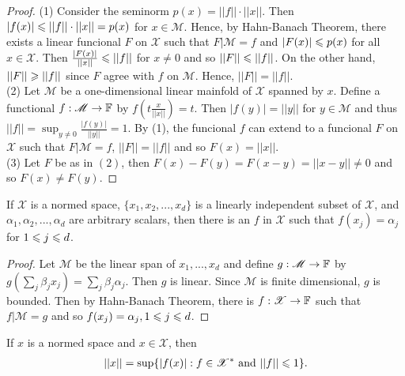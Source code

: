 \begin{proof}
    (1) Consider the seminorm $p(x)=||f||\cdot ||x||$. 
    Then $|f(x)|\leqslant ||f||\cdot ||x||=p(x)$ for $x\in\mathscr{M}$.
    Hence, by Hahn-Banach Theorem,
    there exists a linear funcional $F$ on $\mathscr{X}$ such that 
    $F|\mathscr{M}=f$ and $|F(x)|\leqslant p(x)$ for all $x\in\mathscr{X}$.
    Then $\frac{|F(x)|}{||x||}\leqslant ||f||$ for $x\neq 0$ and so $||F||\leqslant ||f||$.
    On the other hand, $||F||\geqslant ||f||$ since $F$ agree with $f$ on $\mathscr{M}$.
    Hence, $||F||=||f||$.\\
    (2) Let $\mathscr{M}$ be a one-dimensional linear mainfold of $\mathscr{X}$ spanned by $x$.
    Define a functional $f:\mathscr{M}\rightarrow \mathbb{F}$ by $f(t\frac{x}{||x||})=t$. Then $|f(y)|=||y||$ for $y\in\mathscr{M}$
    and thus $||f||=\sup_{y\neq 0} \frac{|f(y)|}{||y||}=1$. 
    By (1), the funcional $f$ can extend to a funcional $F$ on $\mathscr{X}$ such that $F|\mathscr{M}=f$, $||F||=||f||$ and so $F(x)=||x||$.
    \\
    (3) Let $F$ be as in $(2)$, then $F(x)-F(y)=F(x-y)=||x-y||\neq 0$ and so $F(x)\neq F(y)$. 
\end{proof}


\begin{corollary}{}{}
    If $\mathscr{X}$ is a normed space, $\{x_1,x_2,...,x_d\}$ is a linearly independent subset of $\mathscr{X}$, 
    and $\alpha_1,\alpha_2,...,\alpha_d$ are arbitrary scalars, then there is an $f$ in $\mathscr{X}$ such that $f(x_j)=\alpha_j$ for $1\leqslant j\leqslant d$.
\end{corollary}

\begin{proof}
    Let $\mathscr{M}$ be the linear span of $x_1,...,x_d$ and 
    define $g:\mathscr{M}\rightarrow \mathbb{F}$ by $g(\sum\limits_{j}\beta_jx_j)=\sum\limits_{j}\beta_j\alpha_j$.
    Then $g$ is linear. Since $\mathscr{M}$ is finite dimensional, $g$ is bounded. Then by Hahn-Banach Theorem,
    there is $f:\mathscr{X}\rightarrow \mathbb{F}$ such that $f|\mathscr{M}=g$ and so $f(x_j)=\alpha_j, 1\leqslant j\leqslant d$.
\end{proof}

\begin{corollary}{}{}
    If $x$ is a normed space and $x\in\mathscr{X}$, then
    \begin{align*}
        ||x||=\sup \{|f(x)|:f\in\mathscr{X}^* \text{ and } ||f||\leqslant 1\}.
    \end{align*}
\end{corollary}

